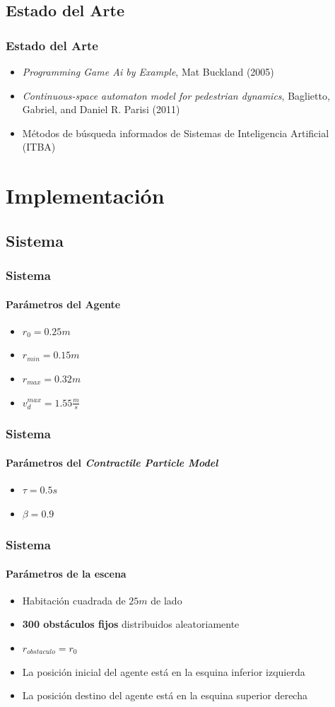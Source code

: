 \documentclass[hyperref={pdfpagelayout=SinglePage}]{beamer}
\begin{document}
\subsection{Estado del Arte}

\begin{frame}
\frametitle{Estado del Arte}
\begin{itemize}
	\item \textit{Programming Game Ai by Example}, Mat Buckland (2005)
	\item \textit{Continuous-space automaton model for pedestrian dynamics}, Baglietto, Gabriel, and Daniel R. Parisi (2011)
	\item Métodos de búsqueda informados de Sistemas de Inteligencia Artificial (ITBA)
\end{itemize}
\end{frame}

\section{Implementación}

\subsection{Sistema}

\begin{frame}
\frametitle{Sistema}
\framesubtitle{Parámetros del Agente}
\begin{itemize}
	\item $r_{0} = 0.25m$
	\item $r_{min} = 0.15m$
	\item $r_{max} = 0.32m$
	\item $v_{d}^{max} = 1.55 \frac{m}{s}$
\end{itemize}
\end{frame}

\begin{frame}
\frametitle{Sistema}
\framesubtitle{Parámetros del \textit{Contractile Particle Model}}
\begin{itemize}
		\item $\tau = 0.5s$
		\item $\beta = 0.9$
\end{itemize}
\end{frame}

\begin{frame}
\frametitle{Sistema}
\framesubtitle{Parámetros de la escena}
\begin{itemize}
	\item Habitación cuadrada de $25m$ de lado
	\item \textbf{300 obstáculos fijos} distribuidos aleatoriamente
	\item $r_{obstaculo} = r_{0}$
	\item La posición inicial del agente está en la esquina inferior izquierda
	\item La posición destino del agente está en la esquina superior derecha 
\end{itemize}
\end{frame}
\end{document}
